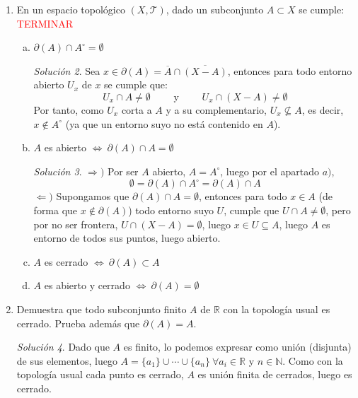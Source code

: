 \documentclass[12pt,twoside]{report}
\newcommand\mc[1]{\mathcal{#1}}
\theoremstyle{azul}
\theoremstyle{azul2}
\theoremstyle{plain}
\theoremstyle{definition}
\theoremstyle{remark}
\newtheorem*{sol}{Solución}
\begin{document}
\begin{enumerate}
\begin{enumerate}[a)]
\begin{sol}
    Para ver un ejemplo en el que no se cumple la igualdad, consideremos la familia de subconjuntos $A_j=\{q_i \in \mathbb{Q}\}$. Tenemos por un lado que $\bigcup A_j = \bigcup \{q_i\}=\mathbb{Q}$, luego $\overline{\bigcup A_j} = \overline{\mathbb{Q}}= \mathbb{R}$. Por otro lado, para cada $j$, $\overline{A_j}=\{q_i\}$ (por ser cada punto ``aislado"), luego $\bigcup \overline{A_j}=\{q_i\}=\mathbb{Q}$. Queda así por tanto terminado el ejemplo de la no igualdad. 
    \end{sol}
\end{enumerate}
\item En un espacio topológico $(X,\mc{T})$, dado un subconjunto $A \subset X$ se cumple: \textcolor{red}{TERMINAR}
\begin{enumerate}[a)]
    \item $\partial(A) \cap A^{\circ} = \emptyset$
    \begin{sol}
        Sea $x \in \partial(A)=\overline{A} \cap \overline{(X-A)}$, entonces para todo entorno abierto $U_x$ de $x$ se cumple que: 
        $$U_x \cap A \neq \emptyset \qquad \text{ y } \qquad U_x \cap (X-A)\neq \emptyset$$
        Por tanto, como $U_x$ corta a $A$ y a su complementario, $U_x \nsubseteq A$, es decir, $x \nin A^{\circ}$ (ya que un entorno suyo no está contenido en $A$).
    \end{sol}
    \item $A$ es abierto $\iff \: \partial (A) \cap A = \emptyset$ 
    \begin{sol}
        $\Rightarrow)$ Por ser $A$ abierto, $A=A^{\circ}$, luego por el apartado $a)$, $$\emptyset=\partial (A) \cap A^{\circ} =  \partial (A) \cap A $$
        $\Leftarrow)$ Supongamos que $\partial (A) \cap A = \emptyset$, entonces para todo $x \in A$ (de forma que $x \nin \partial(A)$) todo entorno suyo $U $, cumple que $U \cap A \neq \emptyset$, pero por no ser frontera, $U \cap (X-A) = \emptyset$, luego $x \in U \subseteq A$, luego $A$ es entorno de todos sus puntos, luego abierto. 
    \end{sol}
    \item $A$ es cerrado $\iff \: \partial(A) \subset A$
    \item $A$ es abierto y cerrado $\iff \: \partial(A)=\emptyset$ 
\end{enumerate}
\item Demuestra que todo subconjunto finito $A$ de $\mathbb{R}$ con la topología usual es cerrado. Prueba además que $\partial(A)=A$.
\begin{sol}
Dado que $A$ es finito, lo podemos expresar como unión (disjunta) de sus elementos, luego $A=\{a_1\} \cup \cdots \cup \{a_n\} \: \forall a_i \in \mathbb{R}$ y $n \in \mathbb{N}$. Como con la topología usual cada punto es cerrado, $A$ es unión finita de cerrados, luego es cerrado. 


\end{sol}
\end{enumerate}
\end{document}
